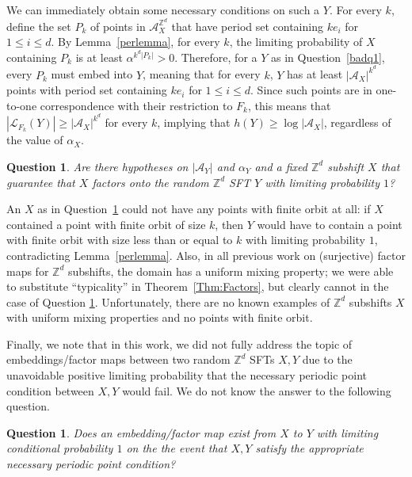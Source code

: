 \documentclass[12pt]{amsart}
\newtheorem{question}[theorem]{Question}
\theoremstyle{definition}
\begin{document}
We can immediately obtain some necessary conditions on such a $Y$. For every $k$, define the set $P_k$ of points in $\mathcal{A}_X^{\mathbb{Z}^d}$ that have period set containing $ke_i$ for $1 \leq i \leq d$. By Lemma~\ref{perlemma}, for every $k$, the limiting probability of $X$ containing $P_k$ is at least $\alpha^{k^d |P_k|} > 0$. Therefore, for a $Y$ as in Question~\ref{badq1}, every $P_k$ must embed into $Y$, meaning that for every $k$, $Y$ has at least $|\mathcal{A}_X|^{k^d}$ points with period set containing $ke_i$ for $1 \leq i \leq d$. Since such points are in one-to-one correspondence with their restriction to $F_k$, this means that $|\mathcal{L}_{F_k}(Y)| \geq |\mathcal{A}_X|^{k^d}$ for every $k$, implying that $h(Y) \geq \log |\mathcal{A}_X|$, regardless of the value of $\alpha_X$.

\begin{question}\label{badq2}
Are there hypotheses on $|\mathcal{A}_Y|$ and $\alpha_Y$ and a fixed $\mathbb{Z}^d$ subshift $X$ that guarantee that $X$ factors onto the random $\mathbb{Z}^d$ SFT $Y$ with limiting probability $1$?
\end{question}

An $X$ as in Question~\ref{badq2} could not have any points with finite orbit at all: if $X$ contained a point with finite orbit of size $k$, then $Y$ would have to contain a point with finite orbit with size less than or equal to $k$ with limiting probability $1$, contradicting Lemma~\ref{perlemma}. Also, in all previous work on (surjective) factor maps for $\mathbb{Z}^d$ subshifts, the domain has a uniform mixing property; we were able to substitute ``typicality'' in Theorem~\ref{Thm:Factors}, but clearly cannot in the case of Question \ref{badq2}. Unfortunately, there are no known examples of $\mathbb{Z}^d$ subshifts $X$ with uniform mixing properties and no points with finite orbit.

Finally, we note that in this work, we did not fully address the topic of embeddings/factor maps between two random $\mathbb{Z}^d$ SFTs $X,Y$ due to the unavoidable positive limiting probability that the necessary periodic point condition between $X,Y$ would fail. We do not know the answer to the following question.

\begin{question}
Does an embedding/factor map exist from $X$ to $Y$ with limiting conditional probability $1$ on the the event that $X,Y$ satisfy the appropriate necessary periodic point condition?
\end{question}



\end{document}
